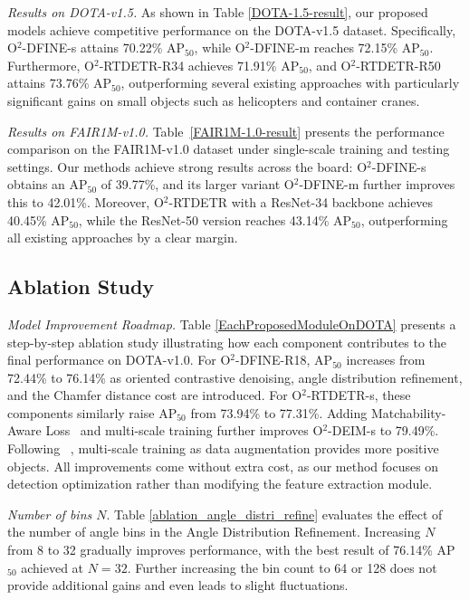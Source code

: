 \documentclass[lettersize,journal]{IEEEtran}
\begin{document}
\textit{Results on DOTA-v1.5.}
As shown in Table \ref{DOTA-1.5-result}, our proposed models achieve competitive performance on the DOTA-v1.5 dataset. Specifically, O$^2$-DFINE-s attains 70.22\% AP$_{50}$, while O$^2$-DFINE-m reaches 72.15\% AP$_{50}$. Furthermore, O$^2$-RTDETR-R34 achieves 71.91\% AP$_{50}$, and O$^2$-RTDETR-R50 attains 73.76\% AP$_{50}$, outperforming several existing approaches with particularly significant gains on small objects such as helicopters and container cranes.



\textit{Results on FAIR1M-v1.0.}  
Table~\ref{FAIR1M-1.0-result} presents the performance comparison on the FAIR1M-v1.0 dataset under single-scale training and testing settings. Our methods achieve strong results across the board: O$^2$-DFINE-s obtains an AP$_{50}$ of 39.77\%, and its larger variant O$^2$-DFINE-m further improves this to 42.01\%. Moreover, O$^2$-RTDETR with a ResNet-34 backbone achieves 40.45\% AP$_{50}$, while the ResNet-50 version reaches 43.14\% AP$_{50}$, outperforming all existing approaches by a clear margin.




\EachProposedModuleOnDOTA

\AblationAngleDistriRefine

\AblationCost





\subsection{Ablation Study}

\textit{Model Improvement Roadmap.}
Table \ref{EachProposedModuleOnDOTA} presents a step-by-step ablation study illustrating how each component contributes to the final performance on DOTA-v1.0. For O$^2$-DFINE-R18, AP$_{50}$ increases from 72.44\% to 76.14\% as oriented contrastive denoising, angle distribution refinement, and the Chamfer distance cost are introduced. For O$^2$-RTDETR-s, these components similarly raise AP$_{50}$ from 73.94\% to 77.31\%. Adding Matchability-Aware Loss~\cite{deim} and multi-scale training further improves O$^2$-DEIM-s to 79.49\%. Following ~\cite{deim}, multi-scale training as data augmentation provides more positive objects. All improvements come without extra cost, as our method focuses on detection optimization rather than modifying the feature extraction module.

\textit{Number of bins $N$}.
Table \ref{ablation_angle_distri_refine} evaluates the effect of the number of angle bins in the Angle Distribution Refinement. Increasing $N$ from 8 to 32 gradually improves performance, with the best result of 76.14\% AP$_{50}$ achieved at $N=32$. Further increasing the bin count to 64 or 128 does not provide additional gains and even leads to slight fluctuations.
\end{document}
